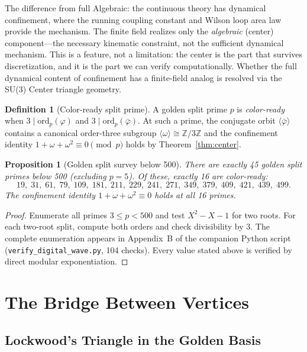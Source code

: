 \documentclass[12pt,oneside]{article}
\theoremstyle{principia}
\newtheorem{proposition}[theorem]{Proposition}
\theoremstyle{definition}
\newtheorem{definition}[theorem]{Definition}
\theoremstyle{remark}
\providecommand{\ZZ}{\mathbb{Z}}
\providecommand{\vp}{\varphi}
\providecommand{\vpbar}{\bar{\varphi}}
\begin{document}
The difference from full Algebraic: the continuous theory has dynamical confinement, where the running coupling constant and Wilson loop area law provide the mechanism. The finite field realizes only the \emph{algebraic} (center) component---the necessary kinematic constraint, not the sufficient dynamical mechanism. This is a feature, not a limitation: the center is the part that survives discretization, and it is the part we can verify computationally. Whether the full dynamical content of confinement has a finite-field analog is resolved via the SU(3) Center triangle geometry.

\begin{definition}[Color-ready split prime]\label{def:colorready}
A golden split prime $p$ is \emph{color-ready} when $3 \mid \mathrm{ord}_p(\vp)$ and $3 \mid \mathrm{ord}_p(\vpbar)$. At such a prime, the conjugate orbit $\langle \vpbar \rangle$ contains a canonical order-three subgroup $\langle \omega \rangle \cong \ZZ/3\ZZ$ and the confinement identity $1 + \omega + \omega^2 \equiv 0 \pmod{p}$ holds by Theorem~\ref{thm:center}.
\end{definition}

\begin{proposition}[Golden split survey below 500]\label{prop:survey}
There are exactly 45 golden split primes below 500 (excluding $p = 5$). Of these, exactly 16 are color-ready:
\[
19,\; 31,\; 61,\; 79,\; 109,\; 181,\; 211,\; 229,\; 241,\; 271,\; 349,\; 379,\; 409,\; 421,\; 439,\; 499.
\]
The confinement identity $1 + \omega + \omega^2 \equiv 0$ holds at all 16 primes.
\end{proposition}

\begin{proof}
Enumerate all primes $3 \leq p < 500$ and test $X^2 - X - 1$ for two roots. For each two-root split, compute both orders and check divisibility by 3. The complete enumeration appears in Appendix~B of the companion Python script (\texttt{verify\_digital\_wave.py}, 104 checks). Every value stated above is verified by direct modular exponentiation. \qedhere
\end{proof}


\section{The Bridge Between Vertices}

\subsection{Lockwood's Triangle in the Golden Basis}
\end{document}
